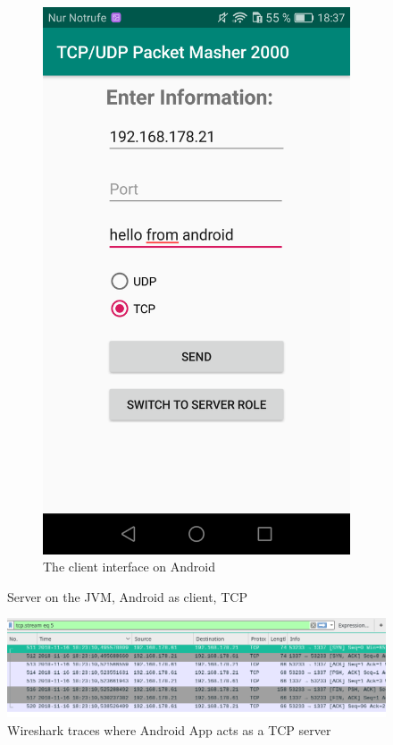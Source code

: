 \begin{figure}[H]
\begin{subfigure}{.49\textwidth}
		\includegraphics[width=0.74\linewidth]{images/task3/subtask2/android/clientTCP.png}
		\caption{The client interface on Android}
	\end{subfigure}%
	\caption{Server on the JVM, Android as client, TCP}
	\label{fig:androidClientTCP}
\end{figure}



\begin{figure}[H]
	\includegraphics[width=1\linewidth]{images/task3/subtask2/wireshark/jvmServerTCP.png}
	\caption{Wireshark traces where Android App acts as a TCP server}
	\label{fig:wire2}
\end{figure}

